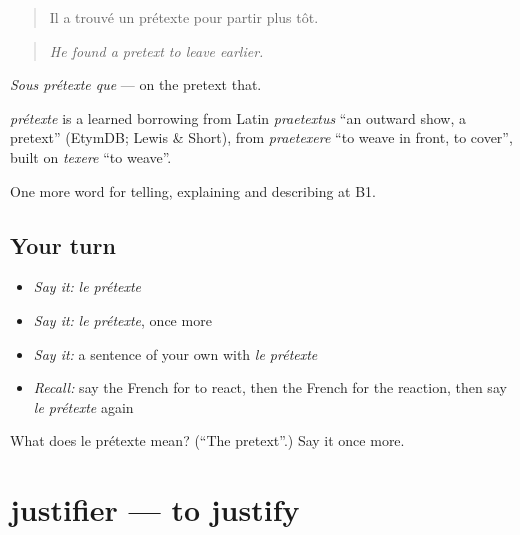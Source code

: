 \begin{quote}
Il a trouvé un prétexte pour partir plus tôt.
\end{quote}

\begin{quote}
\emph{He found a pretext to leave earlier.}
\end{quote}

\emph{Sous prétexte que} — on the pretext that.

\begin{cousinweb}
\emph{prétexte} is a learned borrowing from Latin \emph{praetextus} \textquotedblleft{}an outward show, a pretext\textquotedblright{} (EtymDB; Lewis \& Short), from \emph{praetexere} \textquotedblleft{}to weave in front, to cover\textquotedblright{}, built on \emph{texere} \textquotedblleft{}to weave\textquotedblright{}.
\end{cousinweb}

\begin{grammarlens}[title={What you've built}]
One more word for telling, explaining and describing at B1.
\end{grammarlens}

\subsection*{Your turn}
\begin{itemize}
\raggedright
  \item \emph{Say it:} \emph{le prétexte}
  \item \emph{Say it:} \emph{le prétexte}, once more
  \item \emph{Say it:} a sentence of your own with \emph{le prétexte}
  \item \emph{Recall:} say the French for to react, then the French for the reaction, then say \emph{le prétexte} again
\end{itemize}

\begin{tcolorbox}[breakable,colback=teal!4,colframe=teal!35!black,title={Before you move on}]
What does le prétexte mean? (\textquotedblleft{}The pretext\textquotedblright{}.) Say it once more.
\end{tcolorbox}
\section[justifier]{justifier — to justify}

\label{lesson:FR-C351-justifier}



